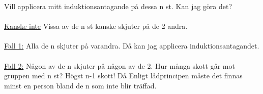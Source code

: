 \documentclass{article}
\begin{document}
                Vill applicera mitt induktionsantagande på dessa n st. Kan jag göra det?\\\\
                \underline{Kanske inte} Vissa av de n st kanske skjuter på de 2 andra.\\\\
                \underline{Fall 1:} Alla de n skjuter på varandra. 
                Då kan jag applicera induktionsantagandet.\\\\
                \underline{Fall 2:} Någon av de n skjuter på någon av de 2. 
                Hur många skott går mot gruppen med n st? Högst n-1 skott! 
                Då Enligt lådprincipen måste det finnas minst en person bland de n som inte blir träffad.
            
\end{document}
